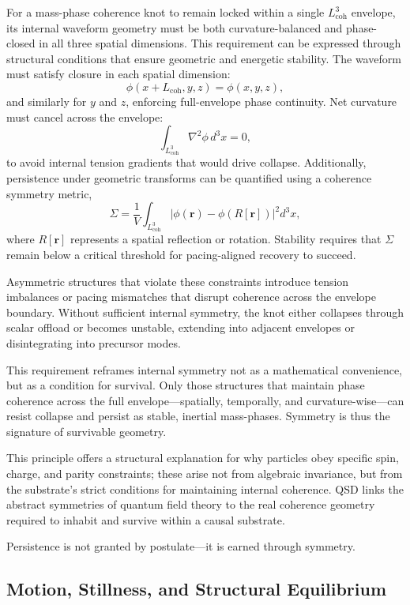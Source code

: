 \documentclass[entropy,article,submit,pdftex,oneauthor]{Definitions/mdpi}
\begin{document}
For a mass-phase coherence knot to remain locked within a single \texorpdfstring{\( L_{\text{coh}}^3 \)}{Lcoh\^{}3} envelope, its internal waveform geometry must be both curvature-balanced and phase-closed in all three spatial dimensions. This requirement can be expressed through structural conditions that ensure geometric and energetic stability. The waveform must satisfy closure in each spatial dimension:
\[
\phi(x + L_{\text{coh}}, y, z) = \phi(x, y, z),
\]
and similarly for \( y \) and \( z \), enforcing full-envelope phase continuity. Net curvature must cancel across the envelope:
\[
\int_{L_{\text{coh}}^3} \nabla^2 \phi \, d^3x = 0,
\]
to avoid internal tension gradients that would drive collapse. Additionally, persistence under geometric transforms can be quantified using a coherence symmetry metric,
\[
\Sigma = \frac{1}{V} \int_{L_{\text{coh}}^3} \left| \phi(\mathbf{r}) - \phi(R[\mathbf{r}]) \right|^2 d^3x,
\]
where \( R[\mathbf{r}] \) represents a spatial reflection or rotation. Stability requires that \( \Sigma \) remain below a critical threshold for pacing-aligned recovery to succeed.

Asymmetric structures that violate these constraints introduce tension imbalances or pacing mismatches that disrupt coherence across the envelope boundary. Without sufficient internal symmetry, the knot either collapses through scalar offload or becomes unstable, extending into adjacent envelopes or disintegrating into precursor modes.

This requirement reframes internal symmetry not as a mathematical convenience, but as a condition for survival. Only those structures that maintain phase coherence across the full envelope—spatially, temporally, and curvature-wise—can resist collapse and persist as stable, inertial mass-phases. Symmetry is thus the signature of survivable geometry.

This principle offers a structural explanation for why particles obey specific spin, charge, and parity constraints; these arise not from algebraic invariance, but from the substrate’s strict conditions for maintaining internal coherence. QSD links the abstract symmetries of quantum field theory to the real coherence geometry required to inhabit and survive within a causal substrate.

Persistence is not granted by postulate—it is earned through symmetry.

\subsection{Motion, Stillness, and Structural Equilibrium}
\end{document}
